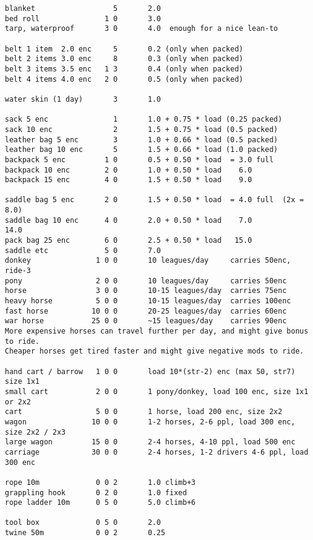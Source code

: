 \begin{verbatim}
blanket                  5       2.0
bed roll               1 0       3.0
tarp, waterproof       3 0       4.0  enough for a nice lean-to

belt 1 item  2.0 enc     5       0.2 (only when packed)
belt 2 items 3.0 enc     8       0.3 (only when packed)
belt 3 items 3.5 enc   1 3       0.4 (only when packed)
belt 4 items 4.0 enc   2 0       0.5 (only when packed)

water skin (1 day)       3       1.0

sack 5 enc               1       1.0 + 0.75 * load (0.25 packed)
sack 10 enc              2       1.5 + 0.75 * load (0.5 packed)
leather bag 5 enc        3       1.0 + 0.66 * load (0.5 packed)
leather bag 10 enc       5       1.5 + 0.66 * load (1.0 packed)
backpack 5 enc         1 0       0.5 + 0.50 * load  = 3.0 full
backpack 10 enc        2 0       1.0 + 0.50 * load    6.0
backpack 15 enc        4 0       1.5 + 0.50 * load    9.0

saddle bag 5 enc       2 0       1.5 + 0.50 * load  = 4.0 full  (2x = 8.0)
saddle bag 10 enc      4 0       2.0 + 0.50 * load    7.0            14.0
pack bag 25 enc        6 0       2.5 + 0.50 * load   15.0
saddle etc             5 0       7.0
donkey               1 0 0       10 leagues/day     carries 50enc, ride-3
pony                 2 0 0       10 leagues/day     carries 50enc
horse                3 0 0       10-15 leagues/day  carries 75enc
heavy horse          5 0 0       10-15 leagues/day  carries 100enc
fast horse          10 0 0       20-25 leagues/day  carries 60enc
war horse           25 0 0       ~15 leagues/day    carries 90enc
More expensive horses can travel further per day, and might give bonus to ride.
Cheaper horses get tired faster and might give negative mods to ride.

hand cart / barrow   1 0 0       load 10*(str-2) enc (max 50, str7) size 1x1
small cart           2 0 0       1 pony/donkey, load 100 enc, size 1x1 or 2x2
cart                 5 0 0       1 horse, load 200 enc, size 2x2
wagon               10 0 0       1-2 horses, 2-6 ppl, load 300 enc, size 2x2 / 2x3
large wagon         15 0 0       2-4 horses, 4-10 ppl, load 500 enc
carriage            30 0 0       2-4 horses, 1-2 drivers 4-6 ppl, load 300 enc

rope 10m             0 0 2       1.0 climb+3
grappling hook       0 2 0       1.0 fixed
rope ladder 10m      0 5 0       5.0 climb+6

tool box             0 5 0       2.0
twine 50m            0 0 2       0.25


\end{verbatim}

